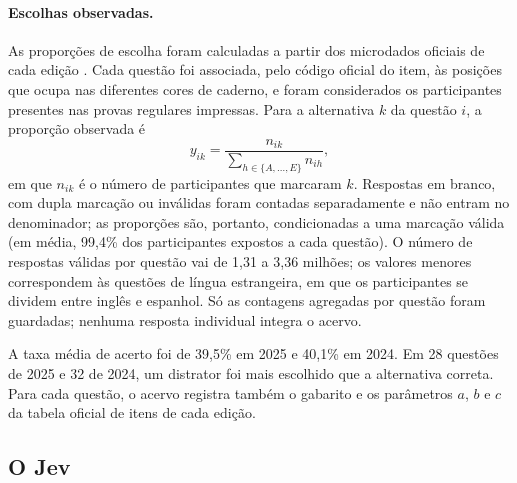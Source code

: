 \paragraph{Escolhas observadas.} As proporções de escolha foram calculadas a partir dos microdados oficiais de cada edição \citep{inep2025microdados2024,inep2026microdados2025}. Cada questão foi associada, pelo código oficial do item, às posições que ocupa nas diferentes cores de caderno, e foram considerados os participantes presentes nas provas regulares impressas. Para a alternativa $k$ da questão $i$, a proporção observada é
\begin{equation}
y_{ik} = \frac{n_{ik}}{\sum_{h \in \{A,\dots,E\}} n_{ih}},
\end{equation}
em que $n_{ik}$ é o número de participantes que marcaram $k$. Respostas em branco, com dupla marcação ou inválidas foram contadas separadamente e não entram no denominador; as proporções são, portanto, condicionadas a uma marcação válida (em média, 99,4\% dos participantes expostos a cada questão). O número de respostas válidas por questão vai de 1,31 a 3,36 milhões; os valores menores correspondem às questões de língua estrangeira, em que os participantes se dividem entre inglês e espanhol. Só as contagens agregadas por questão foram guardadas; nenhuma resposta individual integra o acervo.

A taxa média de acerto foi de 39,5\% em 2025 e 40,1\% em 2024. Em 28 questões de 2025 e 32 de 2024, um distrator foi mais escolhido que a alternativa correta. Para cada questão, o acervo registra também o gabarito e os parâmetros $a$, $b$ e $c$ da tabela oficial de itens de cada edição.

\subsection{O Jev}\label{sec:jev}

